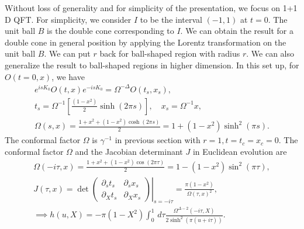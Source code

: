 \documentclass[a4paper,11pt]{article}
\theoremstyle{definition}
\begin{document}
Without loss of generality and for simplicity of the presentation, we focus on 1+1 D QFT. For simplicity, we consider $I$ to be the interval $(-1,1)$ at $t = 0$. The unit ball $B$ is the double cone corresponding to $I$. We can obtain the result for a double cone in general position by applying the Lorentz transformation on the unit ball $B$. We can put $r$ back for ball-shaped region with radius $r$. We can also generalize the result to ball-shaped regions in higher dimension. %
In this set up, for $O(t=0,x)$, we have
\begin{gather}
    e^{isK_0} O(t,x) e^{-isK_0} = \Omega^{-\Delta} O(t_s,x_s), \\
    t_s = {\Omega}^{-1}\left[\frac{(1-x^2)}{2}\sinh(2\pi s) \right], \quad x_s = {\Omega}^{-1}x, \\
    {\Omega}(s,x) =  \frac{1+x^2+(1-x^2)\cosh(2\pi s)}{2} = 1+(1-x^2)\sinh^2(\pi s).
\end{gather}
The conformal factor $\Omega$ is $\gamma^{-1}$ in previous section with $r = 1, t =t_c=x_c=0$. The conformal factor $\Omega$ and the Jacobian determinant $J$ in Euclidean evolution are
\begin{gather}
    \Omega(-i\tau,x)= \frac{1+x^2+(1-x^2)\cos(2\pi \tau)}{2} =1-(1-x^2)\sin^2(\pi \tau),\\
    J(\tau,x) = \det \left.\begin{pmatrix}
        \partial_st_{s} & \partial_s x_{s}\\  \partial_X t_{s}& \partial_X x_{s}
    \end{pmatrix}\right|_{s=-i\tau} =\frac{\pi (1-x^2)}{\Omega(\tau,x)^2},\\
    \implies h(u,X) = -\pi(1-X^2)\int_0^1\, d\tau \frac{\Omega^{\Delta-2}(-i\tau,X)}{2\sinh^2(\pi (u+i\tau))}.
\end{gather}
\end{document}
